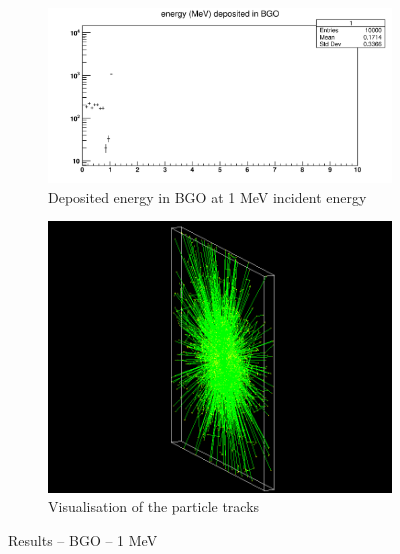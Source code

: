 \documentclass{article}
\begin{document}
\begin{figure}[H]
\centering
\begin{subfigure}{.5\textwidth}
  \centering
  \includegraphics[width=\linewidth]{images/task1/BGO_1MeV.png}
  \caption{Deposited energy in BGO at 1 MeV incident energy}
\end{subfigure}%
\begin{subfigure}{.5\textwidth}
  \centering
  \includegraphics[width=\linewidth]{images/task1/BGO_1MeV_10000.png}
  \caption{Visualisation of the particle tracks}
\end{subfigure}
\caption{Results – BGO – 1 MeV}
\end{figure}
\end{document}

